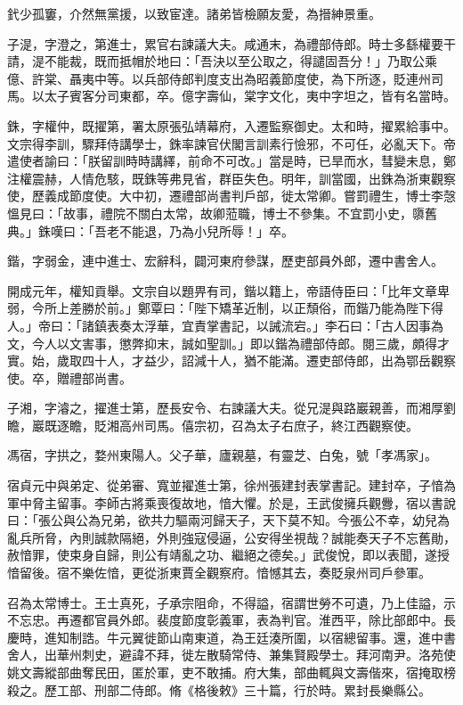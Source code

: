 \begin{pinyinscope}
 釴少孤窶，介然無黨援，以致宦達。諸弟皆檢願友愛，為搢紳景重。



 子湜，字澄之，第進士，累官右諫議大夫。咸通末，為禮部侍郎。時士多繇權要干請，湜不能裁，既而抵帽於地曰：「吾決以至公取之，得譴固吾分！」乃取公乘億、許棠、聶夷中等。以兵部侍郎判度支出為昭義節度使，為下所逐，貶連州司馬。以太子賓客分司東都，卒。億字壽仙，棠字文化，夷中字坦之，皆有名當時。



 銖，字權仲，既擢第，署太原張弘靖幕府，入遷監察御史。太和時，擢累給事中。文宗得李訓，驟拜侍講學士，銖率諫官伏閣言訓素行憸邪，不可任，必亂天下。帝遣使者諭曰：「朕留訓時時講繹，前命不可改。」當是時，已旱而水，彗變未息，鄭注權震赫，人情危駭，既銖等弗見省，群臣失色。明年，訓當國，出銖為浙東觀察使，歷義成節度使。大中初，遷禮部尚書判戶部，徙太常卿。嘗罰禮生，博士李愨慍見曰：「故事，禮院不關白太常，故卿蒞職，博士不參集。不宜罰小史，隳舊典。」銖嘆曰：「吾老不能退，乃為小兒所辱！」卒。



 鍇，字弱金，連中進士、宏辭科，闢河東府參謀，歷吏部員外郎，遷中書舍人。



 開成元年，權知貢舉。文宗自以題畀有司，鍇以籍上，帝語侍臣曰：「比年文章卑弱，今所上差勝於前。」鄭覃曰：「陛下矯革近制，以正頹俗，而鍇乃能為陛下得人。」帝曰：「諸鎮表奏太浮華，宜責掌書記，以誡流宕。」李石曰：「古人因事為文，今人以文害事，懲弊抑末，誠如聖訓。」即以鍇為禮部侍郎。閱三歲，頗得才實。始，歲取四十人，才益少，詔減十人，猶不能滿。遷吏部侍郎，出為鄂岳觀察使。卒，贈禮部尚書。



 子湘，字濬之，擢進士第，歷長安令、右諫議大夫。從兄湜與路巖親善，而湘厚劉瞻，巖既逐瞻，貶湘高州司馬。僖宗初，召為太子右庶子，終江西觀察使。



 馮宿，字拱之，婺州東陽人。父子華，廬親墓，有靈芝、白兔，號「孝馮家」。



 宿貞元中與弟定、從弟審、寬並擢進士第，徐州張建封表掌書記。建封卒，子愔為軍中脅主留事。李師古將乘喪復故地，愔大懼。於是，王武俊擁兵觀釁，宿以書說曰：「張公與公為兄弟，欲共力驅兩河歸天子，天下莫不知。今張公不幸，幼兒為亂兵所脅，內則誠款隔絕，外則強寇侵逼，公安得坐視哉？誠能奏天子不忘舊勛，赦愔罪，使束身自歸，則公有靖亂之功、繼絕之德矣。」武俊悅，即以表聞，遂授愔留後。宿不樂佐愔，更從浙東賈全觀察府。愔憾其去，奏貶泉州司戶參軍。



 召為太常博士。王士真死，子承宗阻命，不得謚，宿謂世勞不可遺，乃上佳謚，示不忘忠。再遷都官員外郎。裴度節度彰義軍，表為判官。淮西平，除比部郎中。長慶時，進知制誥。牛元翼徙節山南東道，為王廷湊所圍，以宿總留事。還，進中書舍人，出華州刺史，避諱不拜，徙左散騎常侍、兼集賢殿學士。拜河南尹。洛苑使姚文壽縱部曲奪民田，匿於軍，吏不敢捕。府大集，部曲輒與文壽偕來，宿掩取榜殺之。歷工部、刑部二侍郎。脩《格後敕》三十篇，行於時。累封長樂縣公。




\end{pinyinscope}
